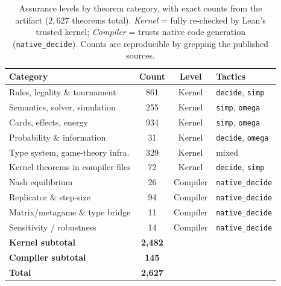 \documentclass[journal]{IEEEtran}
\newif\ifhighlightchanges
\newcommand{\revised}[1]{\ifhighlightchanges\textcolor{blue!70!black}{#1}\else#1\fi}
\begin{document}
\begin{table}[!t]
\centering
\caption{\revised{Assurance levels by theorem category, with exact counts from the artifact ($2{,}627$ theorems total). \emph{Kernel} = fully re-checked by Lean's trusted kernel; \emph{Compiler} = trusts native code generation (\texttt{native\_decide}). Counts are reproducible by grepping the published sources.}}
\label{tab:assurance}
\footnotesize
\begin{tabular}{@{}lccl@{}}
\toprule
\textbf{Category} & \textbf{Count} & \textbf{Level} & \textbf{Tactics} \\
\midrule
Rules, legality \& tournament   & 861  & Kernel   & \texttt{decide}, \texttt{simp} \\
Semantics, solver, simulation   & 255  & Kernel   & \texttt{simp}, \texttt{omega} \\
Cards, effects, energy          & 934  & Kernel   & \texttt{simp}, \texttt{omega} \\
Probability \& information       & 31   & Kernel   & \texttt{decide}, \texttt{omega} \\
Type system, game-theory infra. & 329  & Kernel   & mixed \\
Kernel theorems in compiler files & 72 & Kernel   & \texttt{decide}, \texttt{simp} \\
\midrule
Nash equilibrium                & 26   & Compiler & \texttt{native\_decide} \\
Replicator \& step-size          & 94   & Compiler & \texttt{native\_decide} \\
Matrix/metagame \& type bridge   & 11   & Compiler & \texttt{native\_decide} \\
Sensitivity / robustness        & 14   & Compiler & \texttt{native\_decide} \\
\midrule
\textbf{Kernel subtotal}        & \textbf{2{,}482} & & \\
\textbf{Compiler subtotal}      & \textbf{145} & & \\
\textbf{Total}                  & \textbf{2{,}627} & & \\
\bottomrule
\end{tabular}
\end{table}
\end{document}
